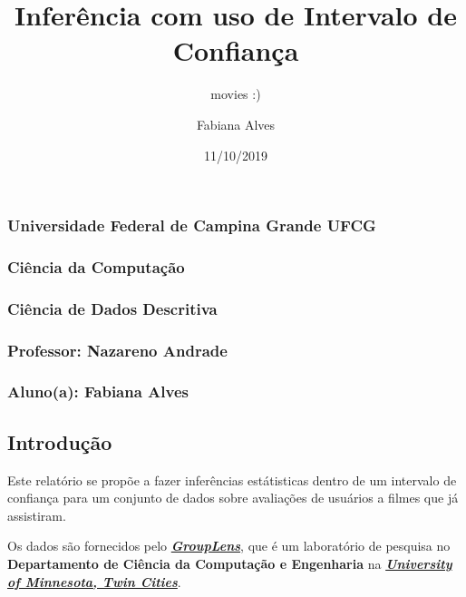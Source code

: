 \documentclass[]{article}
\title{Inferência com uso de Intervalo de Confiança}
\subtitle{movies :)}
\author{Fabiana Alves}
\date{11/10/2019}
\begin{document}
\maketitle

\hypertarget{universidade-federal-de-campina-grande-ufcg}{%
\subsubsection{Universidade Federal de Campina Grande \textbar{}
UFCG}\label{universidade-federal-de-campina-grande-ufcg}}

\hypertarget{ciuxeancia-da-computauxe7uxe3o}{%
\subsubsection{Ciência da
Computação}\label{ciuxeancia-da-computauxe7uxe3o}}

\hypertarget{ciuxeancia-de-dados-descritiva}{%
\subsubsection{Ciência de Dados
Descritiva}\label{ciuxeancia-de-dados-descritiva}}

\hypertarget{professor-nazareno-andrade}{%
\subsubsection{\texorpdfstring{\textbf{Professor}: Nazareno
Andrade}{Professor: Nazareno Andrade}}\label{professor-nazareno-andrade}}

\hypertarget{alunoa-fabiana-alves}{%
\subsubsection{\texorpdfstring{\textbf{Aluno(a)}: Fabiana
Alves}{Aluno(a): Fabiana Alves}}\label{alunoa-fabiana-alves}}

\newpage

\hypertarget{introduuxe7uxe3o}{%
\subsection{Introdução}\label{introduuxe7uxe3o}}

Este relatório se propõe a fazer inferências estátisticas dentro de um
intervalo de confiança para um conjunto de dados sobre avaliações de
usuários a filmes que já assistiram.

Os dados são fornecidos pelo
\textbf{\emph{\href{https://grouplens.org/about/what-is-grouplens/}{GroupLens}}},
que é um laboratório de pesquisa no \textbf{Departamento de Ciência da
Computação e Engenharia} na
\textbf{\emph{\href{https://twin-cities.umn.edu/}{University of
Minnesota, Twin Cities}}}.
\end{document}
